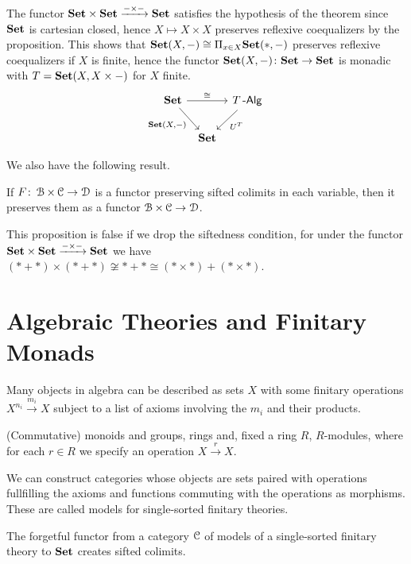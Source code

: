 \documentclass[a4paper,11pt,oneside,openany]{scrbook}
\begin{document}
\begin{exmp}
	The functor ${\normalfont\textbf{Set}}\times{\normalfont\textbf{Set}}\xrightarrow{-\times-}{\normalfont\textbf{Set}}$ satisfies the hypothesis of the theorem since ${\normalfont\textbf{Set}}$ is cartesian closed, hence $X\mapsto X\times X$ preserves reflexive coequalizers by the proposition. This shows that ${\normalfont\textbf{Set}}(X,-)\cong\Pi_{x\in X}{\normalfont\textbf{Set}}(*,-)$ preserves reflexive coequalizers if $X$ is finite, hence the functor ${\normalfont\textbf{Set}}(X,-)\colon{\normalfont\textbf{Set}}\rightarrow{\normalfont\textbf{Set}}$ is monadic with $T={\normalfont\textbf{Set}}(X,X\times-)$ for $X$ finite.
	\[
		\begin{tikzcd}[column sep=tiny]
			\Set\ar[rr, "\cong"] \ar[dr, swap, "{\Set(X,-)}"]
			&& T\Alg\ar[dl, "U^T"] \\
			& \Set
		\end{tikzcd}
	\]
\end{exmp}

We also have the following result.

\begin{prop}
	If $F\colon\operatorname{\mathcal{B}}\times\operatorname{\mathcal{C}}\rightarrow\operatorname{\mathcal{D}}$ is a functor preserving sifted colimits in each variable, then it preserves them as a functor $\operatorname{\mathcal{B}}\times\operatorname{\mathcal{C}}\rightarrow\operatorname{\mathcal{D}}$.
\end{prop}

\begin{rmk}
	This proposition is false if we drop the siftedness condition, for under the functor ${\normalfont\textbf{Set}}\times{\normalfont\textbf{Set}}\xrightarrow{-\times-}{\normalfont\textbf{Set}}$ we have $(*+*)\times (*+*)\not\cong *+*\cong (*\times*)+(*\times *)$.
\end{rmk}

\section{Algebraic Theories and Finitary Monads}

Many objects in algebra can be described as sets $X$ with some finitary operations $X^{n_i}\xrightarrow{m_i}X$ subject to a list of axioms involving the $m_i$ and their products.

\begin{exmp}
	(Commutative) monoids and groups, rings and, fixed a ring $R$, $R$-modules, where for each $r\in R$ we specify an operation $X\xrightarrow{r}X$.
\end{exmp}

We can construct categories whose objects are sets paired with operations fullfilling the axioms and functions commuting with the operations as morphisms. These are called models for single-sorted finitary theories.

\begin{prop}
	The forgetful functor from a category $\operatorname{\mathcal{C}}$ of models of a single-sorted finitary theory to ${\normalfont\textbf{Set}}$ creates sifted colimits.
\end{prop}
\end{document}
